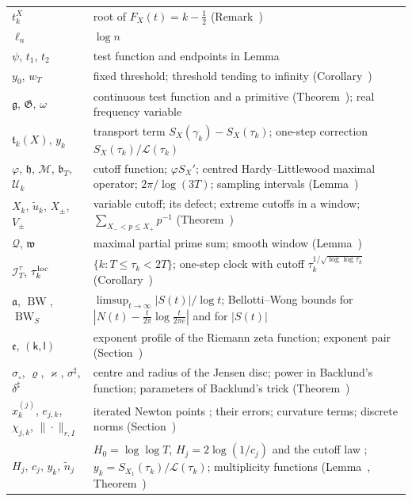 \documentclass[preprint,12pt]{elsarticle}
\makeatletter
\let\CG@origref\ref
\let\CG@origeqref\eqref
\newcommand{\CG@gettip}[1]{\@ifundefined{CGTip@#1}{Reference: #1}{\csname CGTip@#1\endcsname}}
\DeclareRobustCommand{\CGref}[1]{\pdftooltip{\CG@origref{#1}}{\CG@gettip{#1}}}
\DeclareRobustCommand{\CGeqref}[1]{\pdftooltip{\CG@origeqref{#1}}{\CG@gettip{#1}}}
\numberwithin{equation}{section}
\theoremstyle{plain}
\theoremstyle{definition}
\theoremstyle{remark}
\newcommand{\lL}{\mathcal L}
\newcommand{\BW}{\operatorname{BW}}
\newcommand{\BWS}{\operatorname{BW}_S}
\makeatother
\begin{document}
\begin{center}
\begin{longtable}{p{}p{}}
$t_k^X$ & root of $F_X(t)=k-\frac12$ (Remark~\CGref{rem:localization})\\
$\ell_n$ & $\log n$\\
$\psi$, $t_1$, $t_2$ & test function and endpoints in Lemma~\CGref{lem:first_moment_identity}\\
$y_0$, $w_T$ & fixed threshold; threshold tending to infinity (Corollary~\CGref{cor:dichotomy})\\
$\mathfrak g$, $\mathfrak G$, $\omega$ & continuous test function and a primitive (Theorem~\CGref{thm:identity_g}); real frequency variable\\
$\mathfrak t_k(X)$, $y_k$ & transport term $S_X(\gamma_k)-S_X(\tau_k)$; one-step correction $S_X(\tau_k)/\lL(\tau_k)$\\
$\varphi$, $\mathfrak h$, $\mathcal M$, $\mathfrak b_T$, $\mathcal U_k$ & cutoff function; $\varphi S_X'$; centred Hardy--Littlewood maximal operator; $2\pi/\log(3T)$; sampling intervals (Lemma~\CGref{lem:transport})\\
$X_k$, $\tilde u_k$, $X_\pm$, $V_\pm$ & variable cutoff; its defect; extreme cutoffs in a window; $\sum_{X_-<p\le X_+}p^{-1}$ (Theorem~\CGref{thm:variable_cutoff})\\
$\mathcal Q$, $\mathfrak w$ & maximal partial prime sum; smooth window (Lemma~\CGref{lem:maximal_primes})\\
$\mathcal I_T^\tau$, $\tau_k^{\rm loc}$ & $\{k:T\le\tau_k<2T\}$; one-step clock with cutoff $\tau_k^{1/\sqrt{\log\log\tau_k}}$ (Corollary~\CGref{cor:local_clock})\\
$\mathfrak a$, $\BW$, $\BWS$ & $\limsup_{t\to\infty}|S(t)|/\log t$; Bellotti--Wong bounds for $|N(t)-\frac t{2\pi}\log\frac t{2\pi e}|$ and for $|S(t)|$ \CGeqref{eq:BWS_def}\\
$\mathfrak e$, $(\mathsf k,\mathsf l)$ & exponent profile of the Riemann zeta function; exponent pair (Section~\CGref{sec:envelope})\\
$\sigma_\circ$, $\varrho$, $\varkappa$, $\sigma^\sharp$, $\delta^\sharp$ & centre and radius of the Jensen disc; power in Backlund's function; parameters of Backlund's trick (Theorem~\CGref{thm:known_backlund})\\
$x^{(j)}_k$, $e_{j,k}$, $\chi_{j,k}$, $\|\cdot\|_{r,I}$ & iterated Newton points \CGeqref{eq:newton_iteration}; their errors; curvature terms; discrete norms (Section~\CGref{sec:iteration})\\
$H_j$, $c_j$, $y_k$, $\tilde n_j$ & $H_0=\log\log T$, $H_j=2\log(1/c_j)$ and the cutoff law \CGeqref{eq:cutoff_law}; $y_k=S_{X_1}(\tau_k)/\lL(\tau_k)$; multiplicity functions (Lemma~\CGref{lem:multiplicity}, Theorem~\CGref{thm:multiplicity_all})\\

\end{longtable}
\end{center}
\end{document}
